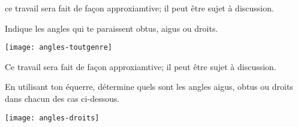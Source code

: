 \vspace{3em}







\begin{exercice}
\prof
{ce travail sera fait de façon approxiamtive; il peut être sujet à discussion.}

Indique les angles qui te paraissent obtus, aigus ou droits.
 \begin{center} \texttt{[image: angles-toutgenre]}  \end{center}
\end{exercice}


\begin{exercice}
\prof
{Ce travail sera fait de façon approxiamtive; il peut être sujet à discussion.}

En utilisant ton équerre, détermine quels sont les angles aigus, obtus ou droits dans chacun des cas ci-dessous.
 \begin{center} \texttt{[image: angles-droits]}  \end{center}
\end{exercice}

\newpage

